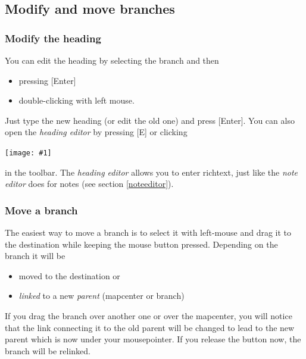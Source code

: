 \documentclass[12pt,a4paper]{article}
\newcommand{\maximage}[1]{  
    \begin{center}
        \texttt{[image: \#1]} 
    \end{center}
}
\newcommand{\key}[1]{[#1]}
\begin{document}
\subsection{Modify and move branches}
\subsubsection*{Modify the heading}  \label{editheading}
You can edit the heading by selecting the branch and then
\begin{itemize}
    \item pressing \key{Enter}
    \item double-clicking with left mouse.
\end{itemize}
Just type the new heading (or edit the old one) and press \key{Enter}.
You can also open the {\em heading editor} by pressing \key{E} or
clicking 
\maximage{images/headingeditor.png}
in the toolbar. The {\em heading editor} allows you to enter richtext, just
like the {\em note editor} does for notes (see section \ref{noteeditor}).

\subsubsection*{Move a branch}
The easiest way to move a branch is to select it with left-mouse and
drag it to the destination while keeping the mouse button pressed.
Depending on the branch  it will be
\begin{itemize}
    \item moved to the destination or
    \item {\em linked} to a new {\em parent} (mapcenter or branch)
\end{itemize}
If you drag the branch over another one or over the mapcenter, you will
notice that the  link connecting it to the old parent will be changed to
lead to the  new parent which is now under your mousepointer.  If you
release the button now, the branch will be relinked.
\end{document}
